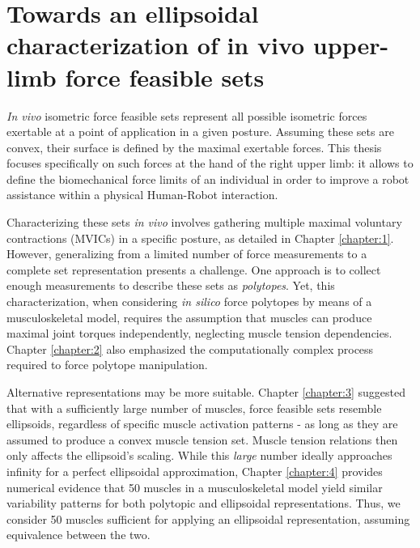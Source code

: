 \chapter{Towards an ellipsoidal characterization of in vivo upper-limb force feasible sets}
\label{chapter:5}

\emph{In vivo} isometric force feasible sets represent all possible isometric forces exertable at a point of application in a given posture. Assuming these sets are convex, their surface is defined by the maximal exertable forces. This thesis focuses specifically on such forces at the hand of the right upper limb: it allows to define the biomechanical force limits of an individual in order to improve a robot assistance within a physical Human-Robot interaction. 

Characterizing these sets \emph{in vivo} involves gathering multiple maximal voluntary contractions (MVICs) in a specific posture, as detailed in Chapter \ref{chapter:1}. However, generalizing from a limited number of force measurements to a complete set representation presents a challenge. One approach is to collect enough measurements to describe these sets as \emph{polytopes}. Yet, this characterization, when considering \emph{in silico} force polytopes by means of a musculoskeletal model, requires the assumption that muscles can produce maximal joint torques independently, neglecting muscle tension dependencies. Chapter \ref{chapter:2} also emphasized the computationally complex process required to force polytope manipulation.

Alternative representations may be more suitable. Chapter \ref{chapter:3} suggested that with a sufficiently large number of muscles, force feasible sets resemble ellipsoids, regardless of specific muscle activation patterns - as long as they are assumed to produce a convex muscle tension set. Muscle tension relations then only affects the ellipsoid's scaling. While this \emph{large} number ideally approaches infinity for a perfect ellipsoidal approximation, Chapter \ref{chapter:4} provides numerical evidence that 50 muscles in a musculoskeletal model yield similar variability patterns for both polytopic and ellipsoidal representations. Thus, we consider 50 muscles sufficient for applying an ellipsoidal representation, assuming equivalence between the two.

